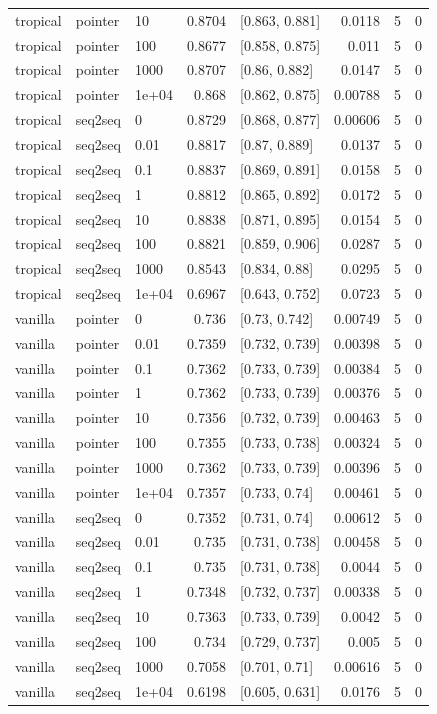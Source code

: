 \documentclass[10pt]{article}
\begin{document}
{\begin{longtable}{lllrlrrr}
tropical & pointer & 10 & 0.8704 & [0.863, 0.881] & 0.0118 & 5 & 0\\
tropical & pointer & 100 & 0.8677 & [0.858, 0.875] & 0.011 & 5 & 0\\
tropical & pointer & 1000 & 0.8707 & [0.86, 0.882] & 0.0147 & 5 & 0\\
tropical & pointer & 1e+04 & 0.868 & [0.862, 0.875] & 0.00788 & 5 & 0\\
tropical & seq2seq & 0 & 0.8729 & [0.868, 0.877] & 0.00606 & 5 & 0\\
tropical & seq2seq & 0.01 & 0.8817 & [0.87, 0.889] & 0.0137 & 5 & 0\\
tropical & seq2seq & 0.1 & 0.8837 & [0.869, 0.891] & 0.0158 & 5 & 0\\
tropical & seq2seq & 1 & 0.8812 & [0.865, 0.892] & 0.0172 & 5 & 0\\
tropical & seq2seq & 10 & 0.8838 & [0.871, 0.895] & 0.0154 & 5 & 0\\
tropical & seq2seq & 100 & 0.8821 & [0.859, 0.906] & 0.0287 & 5 & 0\\
tropical & seq2seq & 1000 & 0.8543 & [0.834, 0.88] & 0.0295 & 5 & 0\\
tropical & seq2seq & 1e+04 & 0.6967 & [0.643, 0.752] & 0.0723 & 5 & 0\\
vanilla & pointer & 0 & 0.736 & [0.73, 0.742] & 0.00749 & 5 & 0\\
vanilla & pointer & 0.01 & 0.7359 & [0.732, 0.739] & 0.00398 & 5 & 0\\
vanilla & pointer & 0.1 & 0.7362 & [0.733, 0.739] & 0.00384 & 5 & 0\\
vanilla & pointer & 1 & 0.7362 & [0.733, 0.739] & 0.00376 & 5 & 0\\
vanilla & pointer & 10 & 0.7356 & [0.732, 0.739] & 0.00463 & 5 & 0\\
vanilla & pointer & 100 & 0.7355 & [0.733, 0.738] & 0.00324 & 5 & 0\\
vanilla & pointer & 1000 & 0.7362 & [0.733, 0.739] & 0.00396 & 5 & 0\\
vanilla & pointer & 1e+04 & 0.7357 & [0.733, 0.74] & 0.00461 & 5 & 0\\
vanilla & seq2seq & 0 & 0.7352 & [0.731, 0.74] & 0.00612 & 5 & 0\\
vanilla & seq2seq & 0.01 & 0.735 & [0.731, 0.738] & 0.00458 & 5 & 0\\
vanilla & seq2seq & 0.1 & 0.735 & [0.731, 0.738] & 0.0044 & 5 & 0\\
vanilla & seq2seq & 1 & 0.7348 & [0.732, 0.737] & 0.00338 & 5 & 0\\
vanilla & seq2seq & 10 & 0.7363 & [0.733, 0.739] & 0.0042 & 5 & 0\\
vanilla & seq2seq & 100 & 0.734 & [0.729, 0.737] & 0.005 & 5 & 0\\
vanilla & seq2seq & 1000 & 0.7058 & [0.701, 0.71] & 0.00616 & 5 & 0\\
vanilla & seq2seq & 1e+04 & 0.6198 & [0.605, 0.631] & 0.0176 & 5 & 0\\
\bottomrule
\end{longtable}
}
\end{document}
